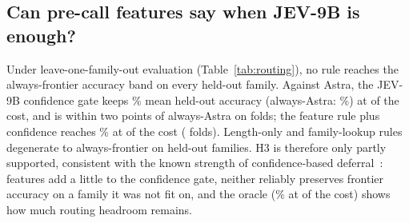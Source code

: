 \subsection{Can pre-call features say when JEV-9B is enough?}
\label{sec:routing-results}
Under leave-one-family-out evaluation (Table~\ref{tab:routing}), no rule reaches the always-frontier accuracy band on every held-out family.
Against Astra, the JEV-9B confidence gate keeps \RouteAstraGateAcc\% mean held-out accuracy (always-Astra: \RouteAstraAfrAcc\%) at \RouteAstraGateCost{} of the cost, and is within two points of always-Astra on \RouteAstraGateWithin{} folds; the feature rule plus confidence reaches \RouteAstraRuleconfAcc\% at \RouteAstraRuleconfCost{} of the cost (\RouteAstraRuleconfWithin{} folds).
Length-only and family-lookup rules degenerate to always-frontier on held-out families.
H3 is therefore only partly supported, consistent with the known strength of confidence-based deferral~\citep{cascadedeferral2023}: features add a little to the confidence gate, neither reliably preserves frontier accuracy on a family it was not fit on, and the oracle (\RouteAstraOracleAcc\% at \RouteAstraOracleCost{} of the cost) shows how much routing headroom remains.
